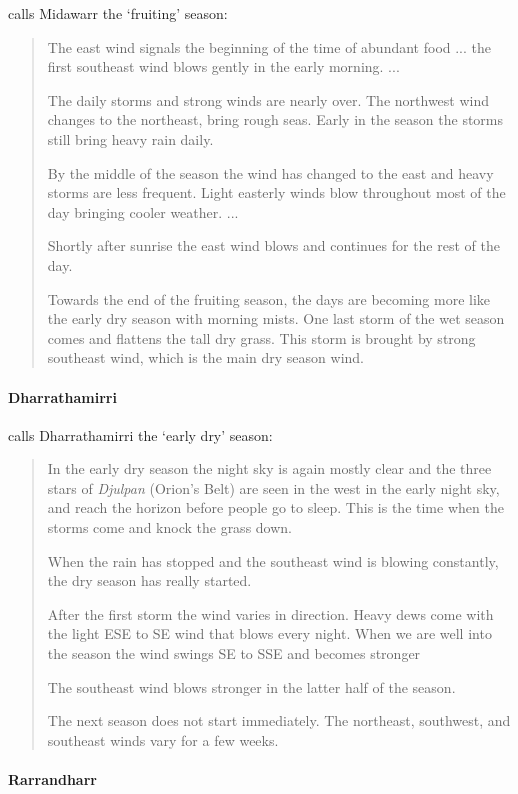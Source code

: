 \citet{davis1989} calls Midawarr the `fruiting' season:
\blockquote{
    The east wind signals the beginning of the time of abundant food ... the first southeast wind blows gently in the early morning. ...
    
    The daily storms and strong winds are nearly over.  The northwest wind changes to the northeast, bring rough seas.
    Early in the season the storms still bring heavy rain daily.
    
    By the middle of the season the wind has changed to the east and heavy storms are less frequent.
    Light easterly winds blow throughout most of the day bringing cooler weather. ...
    
    Shortly after sunrise the east wind blows and continues for the rest of the day.
    
    Towards the end of the fruiting season, the days are becoming more like the early dry season with morning mists.
    One last storm of the wet season comes and flattens the tall dry grass.
    This storm is brought by strong southeast wind, which is the main dry season wind.
}


\paragraph{Dharrathamirri}

\citet{davis1989} calls Dharrathamirri the `early dry' season:
\blockquote{
    In the early dry season the night sky is again mostly clear and the three stars of
    \textit{Djulpan} (Orion's Belt) are seen in the west in the early night sky,
    and reach the horizon before people go to sleep.
    This is the time when the storms come and knock the grass down.
    
    When the rain has stopped and the southeast wind is blowing constantly, the dry season has really started.
    
    After the first storm the wind varies in direction.
    Heavy dews come with the light ESE to SE wind that blows every night.
    When we are well into the season the wind swings SE to SSE and becomes stronger
    
    The southeast wind blows stronger in the latter half of the season.
    
    The next season does not start immediately.
    The northeast, southwest, and southeast winds vary for a few weeks.
}


\paragraph{Rarrandharr}

